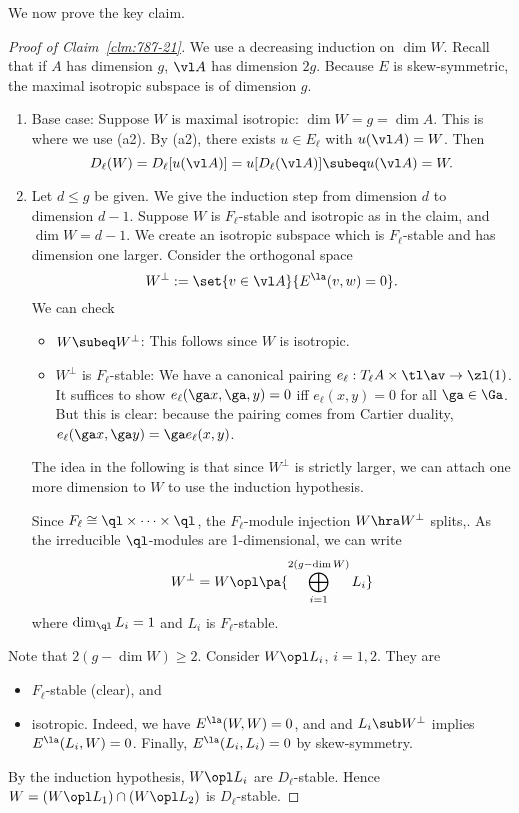 We now prove the key claim. 
\begin{proof}[Proof of Claim~\ref{clm:787-21}]
We use a decreasing induction on $\dim W$. Recall that if $A$ has dimension $g$,  $\vl A$ has dimension $2g$. Because $E$ is skew-symmetric, the maximal isotropic subspace is of dimension $g$. 
\begin{enumerate}
\item
Base case: Suppose $W$ is maximal isotropic: $\dim W=g=\dim A$. This is where we use (a2). By (a2), there exists $u\in E_{\ell}$ with $u(\vl A)=W$. Then
\[
D_{\ell}(W)=D_{\ell}[u(\vl A)]=u[D_{\ell}(\vl A)]\subeq u(\vl A)=W.
\]
\item
Let $d\le g$ be given. We give the induction step from dimension $d$ to dimension $d-1$. Suppose $W$ is $F_{\ell}$-stable and isotropic as in the claim, and $\dim W=d-1$. We create an isotropic subspace which is $F_{\ell}$-stable and has dimension one larger. %
Consider the orthogonal space
\[
W^{\perp}:=\set{v\in \vl A}{E^{\la}(v,w)=0}.
\]
We can check
\begin{itemize}
\item
$W\subeq W^{\perp}$: This follows since $W$ is isotropic.
\item
$W^{\perp}$ is $F_{\ell}$-stable: 
We have a canonical pairing $e_{\ell}:T_{\ell}A\times \tl \av \to \zl(1)$. It suffices to show $e_{\ell}(\ga x,\ga,y)=0$ iff $e_{\ell}(x,y)=0$ for all $\ga\in \Ga$. But this is clear: because the pairing comes from Cartier duality, $e_{\ell}(\ga x,\ga y)=\ga e_{\ell}(x,y)$. %
\end{itemize}
The idea in the following is that since $W^{\perp}$ is strictly larger, we can attach one more dimension to $W$ to use the induction hypothesis.

Since $F_{\ell}\cong \ql \times \cdots \times \ql$, the $F_{\ell}$-module injection $W\hra W^{\perp}$ splits,. As the irreducible $\ql$-modules are 1-dimensional, we can write %
\[
W^{\perp}=W\opl \pa{
\bigoplus_{i=1}^{2(g-\dim W)} L_i
}
\]
where $\dim_{\ql}L_i=1$ and $L_i$ is $F_{\ell}$-stable.
\end{enumerate}

Note that $2(g-\dim W)\ge 2$. Consider $W\opl L_i$, $i=1,2$. They are 
\begin{itemize}
\item
$F_{\ell}$-stable (clear), and
\item
isotropic. Indeed, we have $E^{\la}(W,W)=0$, and and $L_i\sub W^{\perp}$ implies $E^{\la}(L_i , W)=0$. Finally, $E^{\la}(L_i,L_i)=0$ by skew-symmetry. 
\end{itemize}
By the induction hypothesis, $W\opl L_i$ are $D_{\ell}$-stable. Hence $W=(W\opl L_1)\cap (W\opl L_2)$ is $D_{\ell}$-stable.
\end{proof}

